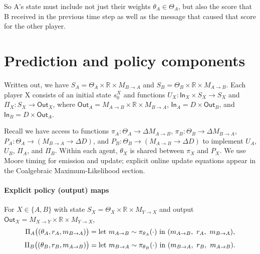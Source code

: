 \documentclass{article}
\theoremstyle{definition}
\begin{document}
So A's state must include not just their weights $\theta_A \in \Theta_A$, but also the score that B received in the previous time step as well as the message that caused that score for the other player.
\section{Prediction and policy components}

Written out, we have $S_A = \Theta_A \times \mathbb{R} \times M_{B\rightarrow A}$ and $S_B = \Theta_B \times \mathbb{R} \times M_{A \rightarrow B}$.
Each player X consists of an initial state $s_0^X$ and functions $U_X : \mathsf{In}_X \times S_X \rightarrow S_X$ and $\Pi_X : S_X \rightarrow \mathsf{Out}_X$, where $\mathsf{Out}_A = M_{A \rightarrow B} \times \mathbb{R} \times M_{B \rightarrow A}$, $\mathsf{In}_A = D \times \mathsf{Out}_B$, and $\mathsf{In}_B = D \times \mathsf{Out}_A$.

Recall we have access to functions $\pi_A : \Theta_A \rightarrow \Delta M_{A \rightarrow B}$, $\pi_B : \Theta_B \rightarrow \Delta M_{B \rightarrow A}$, $P_A : \Theta_A \rightarrow (M_{B \rightarrow A} \rightarrow \Delta D)$, and $P_B : \Theta_B \rightarrow (M_{A \rightarrow B} \rightarrow \Delta D)$ to implement $U_A$, $U_B$, $\Pi_A$, and $\Pi_B$. Within each agent, $\theta_X$ is shared between $\pi_X$ and $P_X$. We use Moore timing for emission and update; explicit online update equations appear in the Coalgebraic Maximum-Likelihood section.

\paragraph{Explicit policy (output) maps}
For $X\in\{A,B\}$ with state $S_X=\Theta_X\times\mathbb{R}\times M_{Y\to X}$ and output $\mathsf{Out}_X=M_{X\to Y}\times\mathbb{R}\times M_{Y\to X}$,
\[
  \Pi_A\bigl((\theta_A, r_A, m_{B\to A})\bigr)
  =\\
  \text{let } m_{A\to B}\sim\pi_{\theta_A}(\cdot)\ \text{in}\ (m_{A\to B},\ r_A,\ m_{B\to A}),
\]
\[
  \Pi_B\bigl((\theta_B, r_B, m_{A\to B})\bigr)
  =\\
  \text{let } m_{B\to A}\sim\pi_{\theta_B}(\cdot)\ \text{in}\ (m_{B\to A},\ r_B,\ m_{A\to B}).
\]
\end{document}
